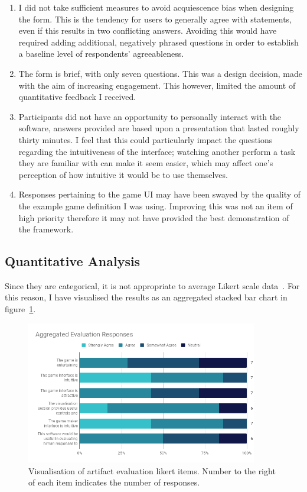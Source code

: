 \begin{enumerate}[label=\textbf{sc.\arabic*}]
    \item\label{sc:acq} I did not take sufficient measures to avoid acquiescence bias\cite{Acquiescence} when designing the form. This is the tendency for users to generally agree with statements, even if this results in two conflicting answers. Avoiding this would have required adding additional, negatively phrased questions in order to establish a baseline level of respondents' agreeableness.
    \item\label{sc:brief} The form is brief, with only seven questions. This was a design decision, made with the aim of increasing engagement. This however, limited the amount of quantitative feedback I received.
    \item\label{sc:int} Participants did not have an opportunity to personally interact with the software, answers provided are based upon a presentation that lasted roughly thirty minutes. I feel that this could particularly impact the questions regarding the intuitiveness of the interface; watching another perform a task they are familiar with can make it seem easier, which may affect one's perception of how intuitive it would be to use themselves.
    \item\label{sc:ex} Responses pertaining to the game UI may have been swayed by the quality of the example game definition I was using. Improving this was not an item of high priority therefore it may not have provided the best demonstration of the framework.
\end{enumerate}
\subsection{Quantitative Analysis}

Since they are categorical, it is not appropriate to average Likert scale data~\cite{LikertAv}. For this reason, I have visualised the results as an aggregated stacked bar chart in figure~\ref{fig:eval_responses}.

\begin{figure}[!h]
    \centering
    \includegraphics[width=0.9\textwidth]{./images/eval/Aggregated_Evaluation_Responses.png}
    \caption{Visualisation of artifact evaluation likert items. Number to the right of each item indicates the number of responses.}\label{fig:eval_responses}
\end{figure}

